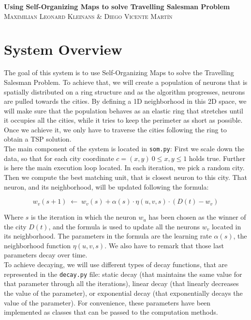 \documentclass[11pt]{article}
\begin{document}
\begin{center}
  \Huge\textbf{Using Self-Organizing Maps to solve Travelling Salesman
    Problem}\\
  \vspace{1cm}
  \large\textsc{Maximilian Leonard Kleinans \& Diego Vicente Martín}
\end{center}

\section{System Overview}

The goal of this system is to use Self-Organizing Maps to solve the Travelling
Salesman Problem. To achieve that, we will create a population of neurons that
is spatially distributed on a ring structure and as the algorithm progresses,
neurons are pulled towards the cities. By defining a 1D neighborhood in this 2D
space, we will make sure that the population behaves as an elastic ring that
stretches until it occupies all the cities, while it tries to keep the perimeter
as short as possible. Once we achieve it, we only have to traverse the cities
following the ring to obtain a TSP solution.\\

The main component of the system is located in \texttt{som.py}: First we scale
down the data, so that for each city coordinate $ c= (x, y) ~ 0 \le x,y \le 1$
holds true. Further is here the main execution loop located. In each iteration,
we pick a random city. Then we compute the best matching unit, that is closest
neuron to this city. That neuron, and its neighborhood, will be updated
following the formula:

$$
w_v(s+1) \; \leftarrow \;
w_v(s) + \alpha (s) \cdot \eta (u, v, s) \cdot (D(t) - w_v)
$$

Where $s$ is the iteration in which the neuron $w_u$ has been chosen as the
winner of the city $D(t)$, and the formula is used to update all the neurons
$w_v$ located in its neighborhood. The parameters in the formula are the
learning rate $\alpha(s)$,  the neighborhood function  $\eta(u, v, s)$. We also
have to remark that those last parameters decay over time.\\

To achieve decaying, we will use different types of decay functions, that are
represented in the \texttt{decay.py} file: static decay (that maintains the same
value for that parameter through all the iterations), linear decay (that linearly
decreases the value of the parameter), or exponential decay (that exponentially
decays the value of the parameter). For convenience, these parameters have been
implemented as classes that can be passed to the computation methods.\\
\end{document}
